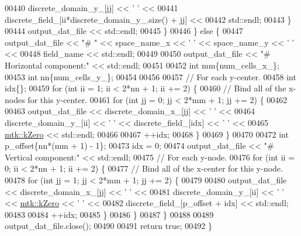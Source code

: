 \begin{DoxyCode}
00440                            discrete\_domain\_y\_[jj] << \textcolor{charliteral}{' '} <<
00441                            discrete\_field\_[ii*discrete\_domain\_y\_.size() + jj] <<
00442                           std::endl;
00443       \}
00444       output\_dat\_file << std::endl;
00445     \}
00446   \} \textcolor{keywordflow}{else} \{
00447     output\_dat\_file << \textcolor{stringliteral}{"# "} << space\_name\_x <<  \textcolor{charliteral}{' '} << space\_name\_y << \textcolor{charliteral}{' '} <<
00448       field\_name << std::endl;
00449 
00450     output\_dat\_file << \textcolor{stringliteral}{"# Horizontal component:"} << std::endl;
00451 
00452     \textcolor{keywordtype}{int} mm\{num\_cells\_x\_\};
00453     \textcolor{keywordtype}{int} nn\{num\_cells\_y\_\};
00454 
00456 
00457     \textcolor{comment}{// For each y-center.}
00458     \textcolor{keywordtype}{int} idx\{\};
00459     \textcolor{keywordflow}{for} (\textcolor{keywordtype}{int} ii = 1; ii < 2*nn + 1; ii += 2) \{
00460       \textcolor{comment}{// Bind all of the x-nodes for this y-center.}
00461       \textcolor{keywordflow}{for} (\textcolor{keywordtype}{int} jj = 0; jj < 2*mm + 1; jj += 2) \{
00462 
00463         output\_dat\_file << discrete\_domain\_x\_[jj] << \textcolor{charliteral}{' '} <<
00464           discrete\_domain\_y\_[ii] << \textcolor{charliteral}{' '} << discrete\_field\_[idx] << \textcolor{charliteral}{' '} <<
00465           \hyperlink{group__c01-roots_ga59a451a5fae30d59649bcda274fea271}{mtk::kZero} << std::endl;
00466 
00467         ++idx;
00468       \}
00469     \}
00470 
00472     \textcolor{keywordtype}{int} p\_offset\{nn*(mm + 1) - 1\};
00473     idx = 0;
00474     output\_dat\_file << \textcolor{stringliteral}{"# Vertical component:"} << std::endl;
00475     \textcolor{comment}{// For each y-node.}
00476     \textcolor{keywordflow}{for} (\textcolor{keywordtype}{int} ii = 0; ii < 2*nn + 1; ii += 2) \{
00477       \textcolor{comment}{// Bind all of the x-center for this y-node.}
00478       \textcolor{keywordflow}{for} (\textcolor{keywordtype}{int} jj = 1; jj < 2*mm + 1; jj += 2) \{
00479 
00480         output\_dat\_file << discrete\_domain\_x\_[jj] << \textcolor{charliteral}{' '} <<
00481           discrete\_domain\_y\_[ii] << \textcolor{charliteral}{' '} << \hyperlink{group__c01-roots_ga59a451a5fae30d59649bcda274fea271}{mtk::kZero} << \textcolor{charliteral}{' '} <<
00482           discrete\_field\_[p\_offset + idx] << std::endl;
00483 
00484         ++idx;
00485       \}
00486     \}
00487   \}
00488 
00489   output\_dat\_file.close();
00490 
00491   \textcolor{keywordflow}{return} \textcolor{keyword}{true};
00492 \}
\end{DoxyCode}
